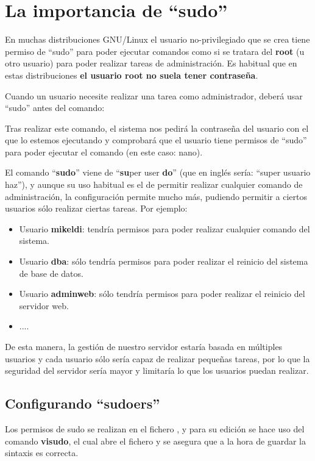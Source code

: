 \documentclass{../../../yukibook.cls/yukibook}
\begin{document}
\section{La importancia de “sudo”}
En muchas distribuciones GNU/Linux el usuario no-privilegiado que se crea tiene permiso de “sudo” para poder ejecutar comandos como si se tratara del \textbf{root} (u otro usuario) para poder realizar tareas de administración. Es habitual que en estas distribuciones \textbf{el usuario root no suela tener contraseña}.

Cuando un usuario necesite realizar una tarea como administrador, deberá usar “sudo” antes del comando:


Tras realizar este comando, el sistema nos pedirá la contraseña del usuario con el que lo estemos ejecutando y comprobará que el usuario tiene permisos de “sudo” para poder ejecutar el comando (en este caso: nano).

El comando “\textbf{sudo}” viene de “\textbf{su}per user \textbf{do}” (que en inglés sería: “super usuario haz”), y aunque su uso habitual es el de permitir realizar cualquier comando de administración, la configuración permite mucho más, pudiendo permitir a ciertos usuarios sólo realizar ciertas tareas. Por ejemplo:

\begin{itemize}
    \item Usuario \textbf{mikeldi}: tendría permisos para poder realizar cualquier comando del sistema.
    \item Usuario \textbf{dba}: sólo tendría permisos para poder realizar el reinicio del sistema de base de datos.
    \item Usuario \textbf{adminweb}: sólo tendría permisos para poder realizar el reinicio del servidor web.
    \item ....
\end{itemize}

De esta manera, la gestión de nuestro servidor estaría basada en múltiples usuarios y cada usuario sólo sería capaz de realizar pequeñas tareas, por lo que la seguridad del servidor sería mayor y limitaría lo que los usuarios puedan realizar.

\subsection{Configurando “sudoers”}
Los permisos de sudo se realizan en el fichero   , y para su edición se hace uso del comando \textbf{visudo}, el cual abre el fichero y se asegura que a la hora de guardar la sintaxis es correcta.
\end{document}
